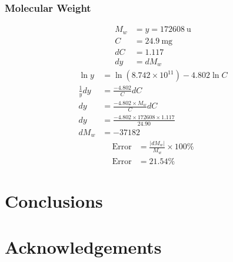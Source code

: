 \documentclass[twocolumn]{article}
\begin{document}
                \subsubsection{Molecular Weight}
                    \begin{align}
                        M_w &= y = \qty{172608}{\atomicmassunit} \nonumber\\
                        C &= \qty{24.9}{\milli\gram} \nonumber\\
                        dC &= 1.117 \nonumber\\
                        dy &= dM_w \nonumber
                    \end{align}
                    \begin{align}
                        \ln y &= \ln{(8.742 \times 10^{11})} - 4.802 \ln{C}\\
                        \frac{1}{y}dy &= \frac{-4.802}{C}dC \nonumber\\
                        dy &= \frac{-4.802 \times M_w}{C}dC \nonumber\\
                        dy &= \frac{-4.802 \times 172608 \times 1.117}{24.90} \nonumber\\
                        dM_w &= - 37182 \nonumber
                    \end{align}
                    \begin{align}
                        \text{Error} &= \frac{|dM_w|}{M_w} \times 100\%\\
                        \text{Error} &= 21.54\% \nonumber
                    \end{align}
        \section{Conclusions}
        \section{Acknowledgements}
        \printbibliography
\end{document}

